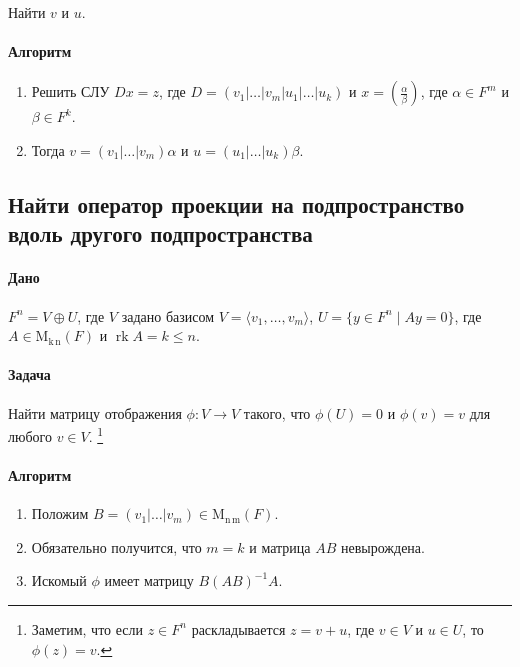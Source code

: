 \documentclass{article}
\newcommand{\MatrixDim}[3]{\operatorname{\mathrm{M}_{#2\,#3}}(#1)}
\newcommand{\rk}{\operatorname{rk}}
\begin{document}
Найти $v$ и $u$.

\paragraph{Алгоритм}

\begin{enumerate}
\item Решить СЛУ $D x = z$, где $D = (v_1|\ldots|v_m|u_1|\ldots|u_k)$ и $x = \left(\frac{\alpha}{\beta}\right)$, где $\alpha\in F^{m}$ и $\beta\in F^{k}$.

\item Тогда $v = (v_1|\ldots|v_m)\alpha$ и $u = (u_1|\ldots|u_k)\beta$.
\end{enumerate}

\subsection{Найти оператор проекции на подпространство вдоль другого подпространства}

\paragraph{Дано}

$F^{n} = V \oplus U$, где $V$ задано базисом $V = \langle v_1,\ldots,v_m\rangle$, $U = \{y\in F^{n}\mid Ay = 0\}$, где $A\in \MatrixDim{F}{k}{n}$ и $\rk A = k \leqslant n$.

\paragraph{Задача}

Найти матрицу отображения $\phi\colon V\to V$ такого, что $\phi(U) = 0$ и $\phi(v) = v$ для любого $v\in V$.%
\footnote{Заметим, что если $z\in F^{n}$ раскладывается $z = v + u$, где $v\in V$ и $u\in U$, то $\phi(z) = v$.}

\paragraph{Алгоритм}

\begin{enumerate}
\item Положим $B = (v_1|\ldots|v_m)\in \MatrixDim{F}{n}{m}$.

\item Обязательно получится, что $m = k$ и матрица $AB$ невырождена.

\item Искомый $\phi$ имеет матрицу $B(AB)^{-1}A$.
\end{enumerate}
\end{document}
